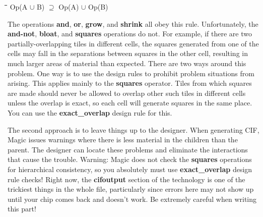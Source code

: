 \documentclass[letterpaper,twoside,12pt]{article}
\def\hinch{\hspace*{0.5in}}
\def\starti{\begin{center}\begin{tabbing}\hinch\=\hinch\=\hinch\=\hinch\=\kill}
\def\endi{\end{tabbing}\end{center}}
\def\ii{\>\>\>}
\begin{document}
\starti
   \ii Op(A $\cup$ B) $\supseteq$ Op(A) $\cup$ Op(B)
\endi

The operations {\bfseries and}, {\bfseries or}, {\bfseries grow}, and
{\bfseries shrink} all
obey this rule.  Unfortunately, the {\bfseries and-not}, {\bfseries bloat},
and {\bfseries squares}
operations do not.  For example, if there are two partially-overlapping
tiles in different cells, the squares generated from one of the cells
may fall in the separations between squares in the other cell, resulting
in much larger areas of material than expected.
There are two ways around this problem.  One
way is to use the design rules to prohibit problem situations from
arising.  This applies mainly to the {\bfseries squares} operator.  Tiles
from which squares are made should never be allowed to overlap
other such tiles in different cells unless the overlap is exact,
so each cell will generate squares in the same place.  You can
use the {\bfseries exact{\_}overlap} design rule for this.

The second approach is to leave things up to the designer.
When generating CIF, Magic issues warnings where there is less material
in the children than the parent.  The designer can locate these problems
and eliminate the interactions that cause the trouble.  Warning:
Magic does not check the {\bfseries squares} operations for hierarchical
consistency, so you absolutely must use {\bfseries exact{\_}overlap} design
rule checks! Right now, the {\bfseries cifoutput} section of the
technology is one of the trickiest things in the whole file, particularly
since errors here may not show up until your chip comes back and doesn't
work.  Be extremely careful when writing this part!
\end{document}
